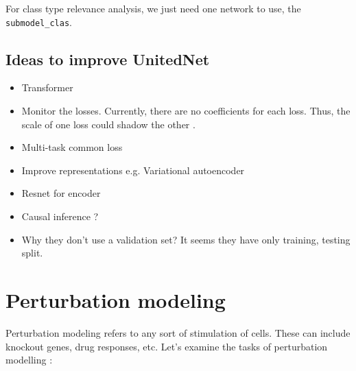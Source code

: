 \documentclass[12pt, a4paper]{article}
\newcommand*{\fullref}[1]{\hyperref[{#1}]{\ref*{#1} \nameref*{#1}}}
\begin{document}
For class type relevance analysis, we just need one network to use, the \verb|submodel_clas|.

\subsection{Ideas to improve UnitedNet}
\label{sec:improvements}

\cite{tangExplainableMultitaskLearning2023}

\begin{itemize}
  \itemsep -0.1em
  \item Transformer
  \item Monitor the losses. Currently, there are no coefficients for each loss. Thus, the scale of one loss could shadow the other \cite{kendallMultiTaskLearningUsing2018}.
  \item Multi-task common loss
  \item Improve representations e.g. Variational autoencoder
  \item Resnet for encoder
  \item Causal inference ?
  \item Why they don't use a validation set? It seems they have only training, testing split.
\end{itemize}


\clearpage

\section{Perturbation modeling}


Perturbation modeling refers to any sort of stimulation of cells. These can include knockout genes, drug responses, etc. Let's examine the tasks of perturbation modelling \cite{gavriilidisMinireviewPerturbationModelling2024}:
\end{document}
